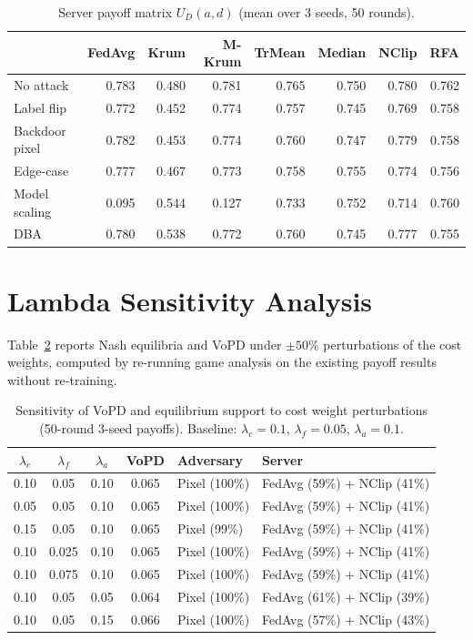 \documentclass{article}
\begin{document}
\begin{table}[h]
\caption{Server payoff matrix $U_D(a,d)$ (mean over 3 seeds, 50 rounds).}
\label{tab:srv_payoff}
\centering
\small
\begin{tabular}{l|rrrrrrr}
\toprule
 & FedAvg & Krum & M-Krum & TrMean & Median & NClip & RFA \\
\midrule
No attack      & 0.783 & 0.480 & 0.781 & 0.765 & 0.750 & 0.780 & 0.762 \\
Label flip     & 0.772 & 0.452 & 0.774 & 0.757 & 0.745 & 0.769 & 0.758 \\
Backdoor pixel & 0.782 & 0.453 & 0.774 & 0.760 & 0.747 & 0.779 & 0.758 \\
Edge-case      & 0.777 & 0.467 & 0.773 & 0.758 & 0.755 & 0.774 & 0.756 \\
Model scaling  & 0.095 & 0.544 & 0.127 & 0.733 & 0.752 & 0.714 & 0.760 \\
DBA            & 0.780 & 0.538 & 0.772 & 0.760 & 0.745 & 0.777 & 0.755 \\
\bottomrule
\end{tabular}
\end{table}

\section{Lambda Sensitivity Analysis}
\label{app:lambda}

Table~\ref{tab:lambda} reports Nash equilibria and VoPD under $\pm 50\%$ perturbations of the cost weights, computed by re-running game analysis on the existing payoff results without re-training.

\begin{table}[h]
\caption{Sensitivity of VoPD and equilibrium support to cost weight perturbations (50-round 3-seed payoffs). Baseline: $\lambda_c=0.1$, $\lambda_f=0.05$, $\lambda_a=0.1$.}
\label{tab:lambda}
\centering
\small
\begin{tabular}{ccc|c|ll}
\toprule
$\lambda_c$ & $\lambda_f$ & $\lambda_a$ & VoPD & Adversary & Server \\
\midrule
0.10 & 0.05 & 0.10 & 0.065 & Pixel (100\%) & FedAvg (59\%) + NClip (41\%) \\
0.05 & 0.05 & 0.10 & 0.065 & Pixel (100\%) & FedAvg (59\%) + NClip (41\%) \\
0.15 & 0.05 & 0.10 & 0.065 & Pixel (99\%)  & FedAvg (59\%) + NClip (41\%) \\
0.10 & 0.025 & 0.10 & 0.065 & Pixel (100\%) & FedAvg (59\%) + NClip (41\%) \\
0.10 & 0.075 & 0.10 & 0.065 & Pixel (100\%) & FedAvg (59\%) + NClip (41\%) \\
0.10 & 0.05 & 0.05 & 0.064 & Pixel (100\%) & FedAvg (61\%) + NClip (39\%) \\
0.10 & 0.05 & 0.15 & 0.066 & Pixel (100\%) & FedAvg (57\%) + NClip (43\%) \\
\bottomrule
\end{tabular}
\end{table}
\end{document}

